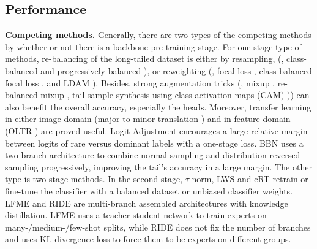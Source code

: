 \subsection{Performance}
\textbf{Competing methods.} Generally, there are two types of the competing methods by whether or not there is a backbone pre-training stage. For one-stage type of methods, re-balancing of the long-tailed dataset is either by resampling, (\eg, class-balanced and progressively-balanced \cite{kang2019decoupling}), or reweighting (\eg, focal loss \cite{lin2017focal}, class-balanced focal loss \cite{cui2019class}, and LDAM \cite{cao2019learning}). Besides, strong augmentation tricks (\eg, mixup \cite{zhang2017mixup}, re-balanced mixup \cite{chou2020remix}, tail sample synthesis using class activation maps (CAM) \cite{zhang2021bag})) can also benefit the overall accuracy, especially the heads. Moreover, transfer learning in either image domain (major-to-minor translation \cite{kim2020m2m}) and in feature domain (OLTR \cite{liu2019large}) are proved useful. Logit Adjustment \cite{menon2020long} encourages a large relative margin between logits of rare
versus dominant labels with a one-stage loss. BBN \cite{zhou2020bbn} uses a two-branch architecture to combine normal sampling and distribution-reversed sampling progressively, improving the tail's accuracy in a large margin. The other type is two-stage methods. In the second stage, $\tau$-norm, LWS and cRT \cite{kang2019decoupling} retrain or fine-tune the classifier with a balanced dataset or unbiased classifier weights. LFME \cite{xiang2020learning} and RIDE \cite{wang2020long} are multi-branch assembled architectures with knowledge distillation. LFME uses a teacher-student network to train experts on many-/medium-/few-shot splits, while RIDE does not fix the number of branches and uses KL-divergence loss to force them to be experts on different groups. \\ 

